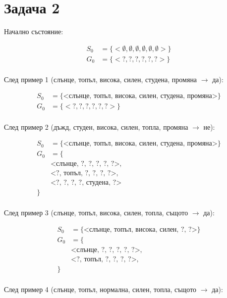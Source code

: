 \documentclass{article}
\begin{document}
\pagebreak

\section*{Задача 2}

Начално състояние:

\begin{align*}
    S_0 &= \{ <\emptyset, \emptyset, \emptyset, \emptyset, \emptyset, \emptyset> \} \\
    G_0 &= \{ <?, ?, ?, ?, ?, ?> \}  \\
\end{align*}

След пример 1 (слънце, топъл, висока, силен, студена, промяна \( \rightarrow \) да):

\begin{align*}
    S_0 &= \{ \textrm{<слънце, топъл, висока, силен, студена, промяна>} \} \\
    G_0 &= \{ <?, ?, ?, ?, ?, ?> \}  \\
\end{align*}

След пример 2 (дъжд, студен, висока, силен, топла, промяна \( \rightarrow \) не):

\begin{align*}
    S_0 &= \{ \textrm{<слънце, топъл, висока, силен, студена, промяна>} \} \\
    G_0 &= \{ \\
        &\textrm{<слънце, ?, ?, ?, ?, ?>}, \\
        &\textrm{<?, топъл, ?, ?, ?, ?>}, \\
        &\textrm{<?, ?, ?, ?, студена, ?>} \\
    \} \\
\end{align*}


След пример 3 (слънце, топъл, висока, силен, топла, същото \( \rightarrow \) да):

\begin{align*}
    S_0 &= \{ \textrm{<слънце, топъл, висока, силен, ?, ?>} \} \\
    G_0 &= \{ \\
        &\textrm{<слънце, ?, ?, ?, ?, ?>}, \\
        &\textrm{<?, топъл, ?, ?, ?, ?>}, \\
    \} \\
\end{align*}

След пример 4 (слънце, топъл, нормална, силен, топла, същото \( \rightarrow \) да):
\end{document}
